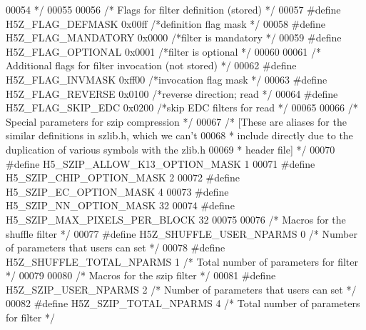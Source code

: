 \begin{DoxyCode}
00054 \textcolor{comment}{                                         */}
00055 
00056 \textcolor{comment}{/* Flags for filter definition (stored) */}
00057 \textcolor{preprocessor}{#define H5Z\_FLAG\_DEFMASK    0x00ff  }\textcolor{comment}{/*definition flag mask      */}\textcolor{preprocessor}{}
00058 \textcolor{preprocessor}{#define H5Z\_FLAG\_MANDATORY      0x0000  }\textcolor{comment}{/*filter is mandatory       */}\textcolor{preprocessor}{}
00059 \textcolor{preprocessor}{#define H5Z\_FLAG\_OPTIONAL   0x0001  }\textcolor{comment}{/*filter is optional        */}\textcolor{preprocessor}{}
00060 
00061 \textcolor{comment}{/* Additional flags for filter invocation (not stored) */}
00062 \textcolor{preprocessor}{#define H5Z\_FLAG\_INVMASK    0xff00  }\textcolor{comment}{/*invocation flag mask      */}\textcolor{preprocessor}{}
00063 \textcolor{preprocessor}{#define H5Z\_FLAG\_REVERSE    0x0100  }\textcolor{comment}{/*reverse direction; read   */}\textcolor{preprocessor}{}
00064 \textcolor{preprocessor}{#define H5Z\_FLAG\_SKIP\_EDC   0x0200  }\textcolor{comment}{/*skip EDC filters for read */}\textcolor{preprocessor}{}
00065 
00066 \textcolor{comment}{/* Special parameters for szip compression */}
00067 \textcolor{comment}{/* [These are aliases for the similar definitions in szlib.h, which we can't}
00068 \textcolor{comment}{ * include directly due to the duplication of various symbols with the zlib.h}
00069 \textcolor{comment}{ * header file] */}
00070 \textcolor{preprocessor}{#define H5\_SZIP\_ALLOW\_K13\_OPTION\_MASK   1}
00071 \textcolor{preprocessor}{#define H5\_SZIP\_CHIP\_OPTION\_MASK        2}
00072 \textcolor{preprocessor}{#define H5\_SZIP\_EC\_OPTION\_MASK          4}
00073 \textcolor{preprocessor}{#define H5\_SZIP\_NN\_OPTION\_MASK          32}
00074 \textcolor{preprocessor}{#define H5\_SZIP\_MAX\_PIXELS\_PER\_BLOCK    32}
00075 
00076 \textcolor{comment}{/* Macros for the shuffle filter */}
00077 \textcolor{preprocessor}{#define H5Z\_SHUFFLE\_USER\_NPARMS    0    }\textcolor{comment}{/* Number of parameters that users can set */}\textcolor{preprocessor}{}
00078 \textcolor{preprocessor}{#define H5Z\_SHUFFLE\_TOTAL\_NPARMS   1    }\textcolor{comment}{/* Total number of parameters for filter */}\textcolor{preprocessor}{}
00079 
00080 \textcolor{comment}{/* Macros for the szip filter */}
00081 \textcolor{preprocessor}{#define H5Z\_SZIP\_USER\_NPARMS    2       }\textcolor{comment}{/* Number of parameters that users can set */}\textcolor{preprocessor}{}
00082 \textcolor{preprocessor}{#define H5Z\_SZIP\_TOTAL\_NPARMS   4       }\textcolor{comment}{/* Total number of parameters for filter */}\textcolor{preprocessor}{}

\end{DoxyCode}
